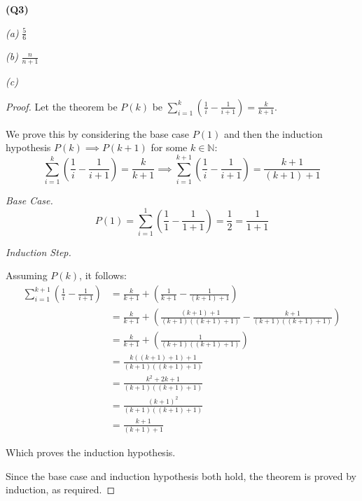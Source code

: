 \documentclass[12pt, a4paper]{article}
\newcommand{\N}{\mathbb{N}}
\begin{document}
\noindent\textbf{(Q3)}

\vspace{5mm}

\noindent\textit{(a)} $\displaystyle{\frac{5}{6}}$\

\vspace{5mm}

\noindent\textit{(b)} $\displaystyle{\frac{n}{n + 1}}$

\vspace{5mm}

\noindent\textit{(c)}

\begin{proof}
    Let the theorem be $P(k)$ be $\sum_{i =  1}^{k}(\frac{1}{i} - \frac{1}{i + 1}) = \frac{k}{k + 1}$.
    
    We prove this by considering the base case $P(1)$ and then the induction hypothesis
    $P(k) \implies P(k + 1)$ for some $k \in \N$:
    \[
        \sum_{i = 1}^{k}\left(\frac{1}{i} - \frac{1}{i + 1}\right) = \frac{k}{k + 1}
        \implies
        \sum_{i = 1}^{k + 1}\left(\frac{1}{i} - \frac{1}{i + 1}\right) = \frac{k + 1}{(k + 1) + 1}
    \]

    \noindent\textit{Base Case.}
    \[
        P(1) = \sum_{i = 1}^{1}\left(\frac{1}{1} - \frac{1}{1 + 1}\right)
        = \frac{1}{2} = \frac{1}{1 + 1}
    \]

    \noindent\textit{Induction Step.}

    Assuming $P(k)$, it follows:
    \begin{align*}
        \sum_{i = 1}^{k + 1}\left(\frac{1}{i} - \frac{1}{i + 1}\right) & =
        \frac{k}{k + 1} + \left(\frac{1}{k + 1} - \frac{1}{(k + 1) + 1}\right)\\
        & = \frac{k}{k + 1} + \left(\frac{(k + 1) + 1}{(k + 1)((k + 1) + 1)} - 
        \frac{k + 1}{(k + 1)((k + 1) + 1)}\right)\\
        & = \frac{k}{k + 1} + \left(\frac{1}{(k + 1)((k + 1) + 1)}\right)\\
        & = \frac{k((k + 1) + 1) + 1}{(k + 1)((k + 1) + 1)}\\
        & = \frac{k^2 + 2k + 1}{(k + 1)((k + 1) + 1)}\\
        & = \frac{(k + 1)^2}{(k + 1)((k + 1) + 1)}\\
        & = \frac{k + 1}{(k + 1) + 1}
    \end{align*}

    Which proves the induction hypothesis.

    Since the base case and induction hypothesis both hold, the theorem is proved
    by induction, as required.

\end{proof}
\end{document}
